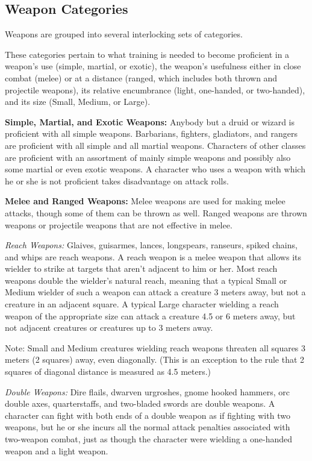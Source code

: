 \subsection{Weapon Categories}
Weapons are grouped into several interlocking sets of categories.

These categories pertain to what training is needed to become proficient in a weapon's use (simple, martial, or exotic), the weapon's usefulness either in close combat (melee) or at a distance (ranged, which includes both thrown and projectile weapons), its relative encumbrance (light, one-handed, or two-handed), and its size (Small, Medium, or Large).

\textbf{Simple, Martial, and Exotic Weapons:} Anybody but a druid or wizard is proficient with all simple weapons. Barbarians, fighters, gladiators, and rangers are proficient with all simple and all martial weapons. Characters of other classes are proficient with an assortment of mainly simple weapons and possibly also some martial or even exotic weapons. A character who uses a weapon with which he or she is not proficient takes disadvantage on attack rolls.

\textbf{Melee and Ranged Weapons:} Melee weapons are used for making melee attacks, though some of them can be thrown as well. Ranged weapons are thrown weapons or projectile weapons that are not effective in melee.

\textit{Reach Weapons:} Glaives, guisarmes, lances, longspears, ranseurs, spiked chains, and whips are reach weapons. A reach weapon is a melee weapon that allows its wielder to strike at targets that aren't adjacent to him or her. Most reach weapons double the wielder's natural reach, meaning that a typical Small or Medium wielder of such a weapon can attack a creature 3 meters away, but not a creature in an adjacent square. A typical Large character wielding a reach weapon of the appropriate size can attack a creature 4.5 or 6 meters away, but not adjacent creatures or creatures up to 3 meters away.

Note: Small and Medium creatures wielding reach weapons threaten all squares 3 meters (2 squares) away, even diagonally. (This is an exception to the rule that 2 squares of diagonal distance is measured as 4.5 meters.)

\textit{Double Weapons:} Dire flails, dwarven urgroshes, gnome hooked hammers, orc double axes, quarterstaffs, and two-bladed swords are double weapons. A character can fight with both ends of a double weapon as if fighting with two weapons, but he or she incurs all the normal attack penalties associated with two-weapon combat, just as though the character were wielding a one-handed weapon and a light weapon.

